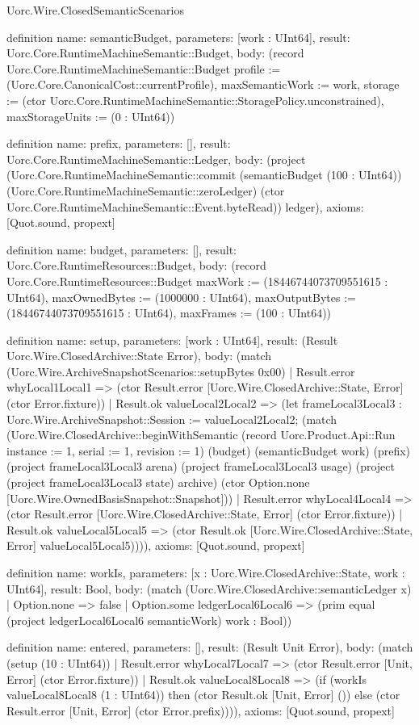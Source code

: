 \begin{lexlean}{Uorc.Wire.ClosedSemanticScenarios}
\begin{semanticmodule}
definition{
  name: semanticBudget,
  parameters: [work : UInt64],
  result: Uorc.Core.RuntimeMachineSemantic::Budget,
  body: (record Uorc.Core.RuntimeMachineSemantic::Budget {profile := (Uorc.Core.CanonicalCost::currentProfile), maxSemanticWork := work, storage := (ctor Uorc.Core.RuntimeMachineSemantic::StoragePolicy.unconstrained), maxStorageUnits := (0 : UInt64)})
}

definition{
  name: prefix,
  parameters: [],
  result: Uorc.Core.RuntimeMachineSemantic::Ledger,
  body: (project (Uorc.Core.RuntimeMachineSemantic::commit (semanticBudget (100 : UInt64)) (Uorc.Core.RuntimeMachineSemantic::zeroLedger) (ctor Uorc.Core.RuntimeMachineSemantic::Event.byteRead)) ledger),
  axioms: [Quot.sound, propext]
}

definition{
  name: budget,
  parameters: [],
  result: Uorc.Core.RuntimeResources::Budget,
  body: (record Uorc.Core.RuntimeResources::Budget {maxWork := (18446744073709551615 : UInt64), maxOwnedBytes := (1000000 : UInt64), maxOutputBytes := (18446744073709551615 : UInt64), maxFrames := (100 : UInt64)})
}

definition{
  name: setup,
  parameters: [work : UInt64],
  result: (Result Uorc.Wire.ClosedArchive::State Error),
  body: (match (Uorc.Wire.ArchiveSnapshotScenarios::setupBytes 0x00)
    | Result.error whyLocal1Local1 => (ctor Result.error [Uorc.Wire.ClosedArchive::State, Error] (ctor Error.fixture))
    | Result.ok valueLocal2Local2 => (let frameLocal3Local3 : Uorc.Wire.ArchiveSnapshot::Session := valueLocal2Local2; (match (Uorc.Wire.ClosedArchive::beginWithSemantic (record Uorc.Product.Api::Run {instance := 1, serial := 1, revision := 1}) (budget) (semanticBudget work) (prefix) (project frameLocal3Local3 arena) (project frameLocal3Local3 usage) (project (project frameLocal3Local3 state) archive) (ctor Option.none [Uorc.Wire.OwnedBasisSnapshot::Snapshot]))
      | Result.error whyLocal4Local4 => (ctor Result.error [Uorc.Wire.ClosedArchive::State, Error] (ctor Error.fixture))
      | Result.ok valueLocal5Local5 => (ctor Result.ok [Uorc.Wire.ClosedArchive::State, Error] valueLocal5Local5)))),
  axioms: [Quot.sound, propext]
}

definition{
  name: workIs,
  parameters: [x : Uorc.Wire.ClosedArchive::State, work : UInt64],
  result: Bool,
  body: (match (Uorc.Wire.ClosedArchive::semanticLedger x)
    | Option.none => false
    | Option.some ledgerLocal6Local6 => (prim equal (project ledgerLocal6Local6 semanticWork) work : Bool))
}

definition{
  name: entered,
  parameters: [],
  result: (Result Unit Error),
  body: (match (setup (10 : UInt64))
    | Result.error whyLocal7Local7 => (ctor Result.error [Unit, Error] (ctor Error.fixture))
    | Result.ok valueLocal8Local8 => (if (workIs valueLocal8Local8 (1 : UInt64)) then (ctor Result.ok [Unit, Error] ()) else (ctor Result.error [Unit, Error] (ctor Error.prefix)))),
  axioms: [Quot.sound, propext]
}


\end{semanticmodule}
\end{lexlean}
